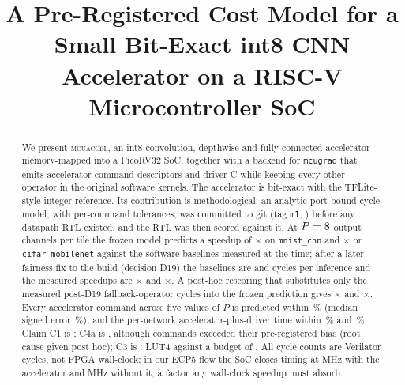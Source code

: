 \documentclass[conference]{IEEEtran}
\newcommand{\sys}{\textsc{mcuaccel}}
\begin{document}
\title{A Pre-Registered Cost Model for a Small Bit-Exact int8 CNN Accelerator on a RISC-V Microcontroller SoC}
\author{}
\maketitle

\begin{abstract}
We present \sys{}, an int8 convolution, depthwise and fully connected accelerator memory-mapped into a PicoRV32 SoC, together with a backend for \texttt{mcugrad} that emits accelerator command descriptors and driver C while keeping every other operator in the original software kernels. The accelerator is bit-exact with the TFLite-style integer reference. Its contribution is methodological: an analytic port-bound cycle model, with per-command tolerances, was committed to git (tag \texttt{m1}, \MOneCommitShort) before any datapath RTL existed, and the RTL was then scored against it. At $P=8$ output channels per tile the frozen model predicts a speedup of \PredSpeedupMnistPeight$\times$ on \texttt{mnist\_cnn} and \PredSpeedupCifarPeight$\times$ on \texttt{cifar\_mobilenet} against the software baselines measured at the time; after a later fairness fix to the build (decision D19) the baselines are \BaselineCyclesMnist{} and \BaselineCyclesCifar{} cycles per inference and the measured speedups are \MeasSpeedupMnistPeight$\times$ and \MeasSpeedupCifarPeight$\times$. A post-hoc rescoring that substitutes only the measured post-D19 fallback-operator cycles into the frozen prediction gives \PostHocSpeedupMnist$\times$ and \PostHocSpeedupCifar$\times$. Every accelerator command across five values of $P$ is predicted within \MeasCfourMaxErr\,\% (median signed error \MeasCfourMedianErr\,\%), and the per-network accelerator-plus-driver time within \MeasCfourBErrMnist\,\% and \MeasCfourBErrCifar\,\%. Claim C1 is \VerdictCone{}; C4a is \VerdictCfourA{}, although \NExceed{} commands exceeded their pre-registered bias (root cause given post hoc); C3 is \VerdictCthree{}: \SynAccelPeightLut{} LUT4 against a budget of \BudgetLut. All cycle counts are Verilator cycles, not FPGA wall-clock; in our ECP5 flow the SoC closes timing at \SynSocPeightFmax{} MHz with the accelerator and \SynSocNoAccelFmax{} MHz without it, a factor any wall-clock speedup must absorb.
\end{abstract}
\end{document}
